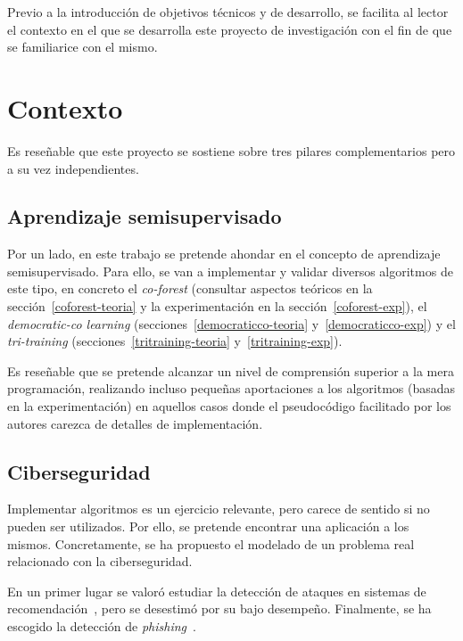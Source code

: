 
Previo a la introducción de objetivos técnicos y de desarrollo, se facilita al lector el contexto en el que se desarrolla este proyecto de investigación con el fin de que se familiarice con el mismo.

\section{Contexto}
\label{contexto}

Es reseñable que este proyecto se sostiene sobre tres pilares complementarios pero a su vez independientes.

\subsection{Aprendizaje semisupervisado}

Por un lado, en este trabajo se pretende ahondar en el concepto de aprendizaje semisupervisado. Para ello, se van a implementar y validar diversos algoritmos de este tipo, en concreto el \textit{co-forest} (consultar aspectos teóricos en la sección~\ref{coforest-teoria} y la experimentación en la sección~\ref{coforest-exp}), el \textit{democratic-co learning} (secciones~\ref{democraticco-teoria} y~\ref{democraticco-exp}) y el \textit{tri-training} (secciones~\ref{tritraining-teoria} y~\ref{tritraining-exp}).

Es reseñable que se pretende alcanzar un nivel de comprensión superior a la mera programación, realizando incluso pequeñas aportaciones a los algoritmos (basadas en la experimentación) en aquellos casos donde el pseudocódigo facilitado por los autores carezca de detalles de implementación.

\subsection{Ciberseguridad}

Implementar algoritmos es un ejercicio relevante, pero carece de sentido si no pueden ser utilizados. Por ello, se pretende encontrar una aplicación a los mismos. Concretamente, se ha propuesto el modelado de un problema real relacionado con la ciberseguridad.

En un primer lugar se valoró estudiar la detección de ataques en sistemas de recomendación~\cite{zhou2021SemisupervisedRecommendationAttack}, pero se desestimó por su bajo desempeño. Finalmente, se ha escogido la detección de \textit{phishing}~\cite{featuresPhishing2018Gupta}.

